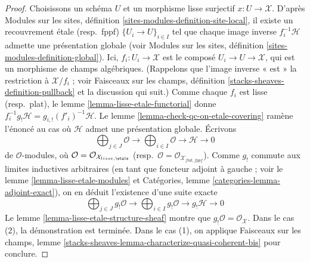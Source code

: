 \begin{proof}
Choisissons un schéma $U$ et un morphisme lisse surjectif $x : U \to \mathcal{X}$.
D'après
Modules sur les sites, définition \ref{sites-modules-definition-site-local},
il existe un recouvrement étale (resp.\ fppf)
$\{U_i \to U\}_{i \in I}$ tel que chaque image inverse $f_i^{-1}\mathcal{H}$
admette une présentation globale (voir
Modules sur les sites, définition \ref{sites-modules-definition-global}).
Ici, $f_i : U_i \to \mathcal{X}$ est le composé
$U_i \to U \to \mathcal{X}$, qui est un morphisme de champs algébriques.
(Rappelons que l'image inverse « est » la restriction à $\mathcal{X}/f_i$ ; voir
Faisceaux sur les champs, définition \ref{stacks-sheaves-definition-pullback}
et la discussion qui suit.) Comme chaque $f_i$ est lisse (resp.\ plat), le
lemme \ref{lemma-lisse-etale-functorial}
donne $f_i^{-1}g_!\mathcal{H} = g_{i, !}(f'_i)^{-1}\mathcal{H}$.
Le lemme \ref{lemma-check-qc-on-etale-covering}
ramène l'énoncé au cas où $\mathcal{H}$
admet une présentation globale. Écrivons
$$
\bigoplus\nolimits_{j \in J} \mathcal{O} \longrightarrow
\bigoplus\nolimits_{i \in I} \mathcal{O} \longrightarrow
\mathcal{H} \longrightarrow 0
$$
de $\mathcal{O}$-modules, où
$\mathcal{O} = \mathcal{O}_{\mathcal{X}_{lisse,\etale}}$
(resp.\ $\mathcal{O} = \mathcal{O}_{\mathcal{X}_{flat,fppf}}$).
Comme $g_!$ commute aux limites inductives arbitraires (en tant que foncteur
adjoint à gauche ; voir le lemme \ref{lemma-lisse-etale-modules} et
Catégories, lemme \ref{categories-lemma-adjoint-exact}),
on en déduit l'existence d'une suite exacte
$$
\bigoplus\nolimits_{j \in J} g_!\mathcal{O} \longrightarrow
\bigoplus\nolimits_{i \in I} g_!\mathcal{O} \longrightarrow
g_!\mathcal{H} \longrightarrow 0
$$
Le lemme \ref{lemma-lisse-etale-structure-sheaf}
montre que $g_!\mathcal{O} = \mathcal{O}_\mathcal{X}$.
Dans le cas (2), la démonstration est terminée. Dans le cas (1), on applique
Faisceaux sur les champs, lemme
\ref{stacks-sheaves-lemma-characterize-quasi-coherent-bis}
pour conclure.
\end{proof}

